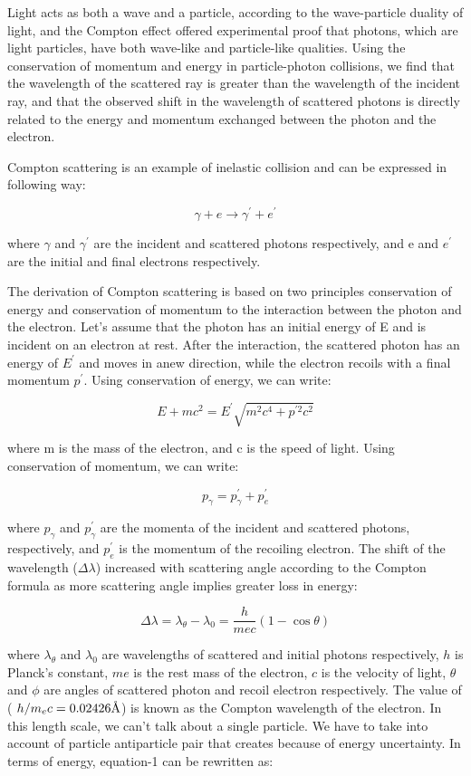 	Light acts as both a wave and a particle, according to the wave-particle duality of light, and the Compton effect offered experimental proof that photons, which are light particles, have both wave-like and particle-like qualities. Using the conservation of momentum and energy in particle-photon collisions, we find that the wavelength of the scattered ray is greater than the wavelength of the incident ray, and that the observed shift in the wavelength of scattered photons is directly related to the energy and momentum exchanged between the photon and the electron.

	Compton scattering is an example of inelastic collision and can be expressed in following way:

	$$\gamma + e \rightarrow \gamma^{'} + e^{'}$$

	where $\gamma$ and $\gamma^{'}$  are the incident and scattered photons respectively, and e and $e^{'}$ are the initial and final electrons respectively.


	The derivation of Compton scattering is based on two principles conservation of energy and conservation of momentum to the interaction between the photon and the electron. Let's assume that the photon has an initial energy of E and is incident on an electron at rest. After the interaction, the scattered photon has an energy of $E^{'}$ and moves in anew direction, while the electron recoils with a final momentum $p^{'}$. Using conservation of energy, we can write:

	$$E + mc^2 = E^{'} \sqrt{m^2c^4+p^{'2}c^2}$$

	where m is the mass of the electron, and c is the speed of light. Using conservation of momentum, we can write:

	$$p_{\gamma} = p^{'}_{\gamma} + p^{'}_{e}$$

	where $p_{\gamma}$ and $p^{'}_{\gamma}$ are the momenta of the incident and scattered photons, respectively, and $p^{'}_{e}$ is the momentum of the recoiling electron. The shift of the wavelength ($\Delta\lambda$) increased with scattering angle according to the Compton formula as more scattering angle implies greater loss in energy:

	$$\Delta\lambda = \lambda_\theta - \lambda_0 = \frac{h}{mec}\left(1-\cos\theta\right)$$

	where $\lambda_\theta$ and $\lambda_0$ are wavelengths of scattered and initial photons respectively, $h$ is Planck's constant, $me$ is the rest mass of the electron, $c$ is the velocity of light, $\theta$ and $\phi$ are angles of scattered photon and recoil electron respectively. The value of ( $h/m_ec = 0.02426\textup{\AA}$) is known as the Compton wavelength of the electron. In this length scale, we can't talk about a single particle. We have to take into account of particle antiparticle pair that creates because of energy uncertainty. In terms of energy, equation-1 can be rewritten as:

